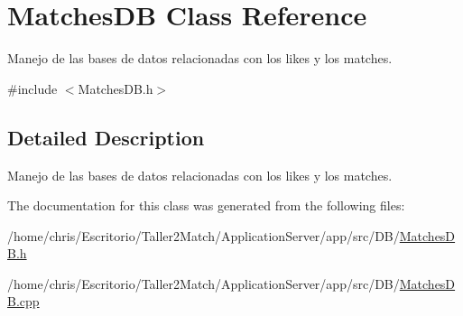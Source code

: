 \hypertarget{class_matches_d_b}{}\section{Matches\+D\+B Class Reference}
\label{class_matches_d_b}


Manejo de las bases de datos relacionadas con los likes y los matches.  




{\ttfamily \#include $<$Matches\+D\+B.\+h$>$}



\subsection{Detailed Description}
Manejo de las bases de datos relacionadas con los likes y los matches. 

The documentation for this class was generated from the following files\+:\begin{DoxyCompactItemize}
\item 
/home/chris/\+Escritorio/\+Taller2\+Match/\+Application\+Server/app/src/\+D\+B/\hyperlink{_matches_d_b_8h}{Matches\+D\+B.\+h}\item 
/home/chris/\+Escritorio/\+Taller2\+Match/\+Application\+Server/app/src/\+D\+B/\hyperlink{_matches_d_b_8cpp}{Matches\+D\+B.\+cpp}\end{DoxyCompactItemize}
